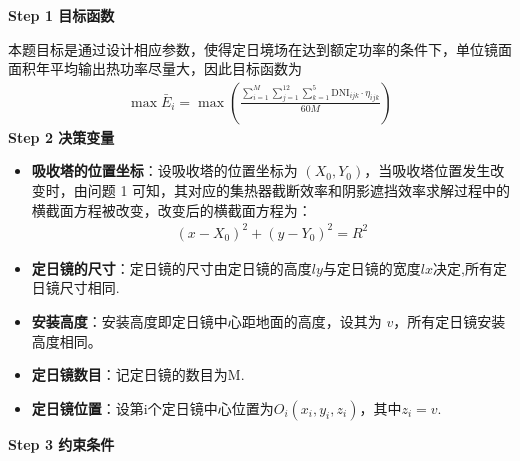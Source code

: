 \documentclass[../main.tex]{subfiles}
\begin{document}
  \noindent \textbf{Step 1 目标函数}
  \par 本题目标是通过设计相应参数，使得定日境场在达到额定功率的条件下，单位镜面面积年平均输出热功率尽量大，因此目标函数为
  \begin{align}\label{2.1}
    \max \bar{E}_i = \max\left( \frac{\sum_{i=1}^{M} \sum_{j=1}^{12} \sum_{k=1}^{5} \text{DNI}_{ijk} \cdot \eta_{ijk}}{60M} \right)
  \end{align}
  \noindent \textbf{Step 2 决策变量}
   \begin{itemize}
  \item \textbf{吸收塔的位置坐标}：设吸收塔的位置坐标为 \((X_0, Y_0)\)，当吸收塔位置发生改变时，由问题 1 可知，其对应的集热器截断效率和阴影遮挡效率求解过程中的横截面方程被改变，改变后的横截面方程为：
  \begin{align}\label{2.2}
    (x - X_0)^2 + (y - Y_0)^2 = R^2
  \end{align}
  \item \textbf{定日镜的尺寸}：定日镜的尺寸由定日镜的高度\(ly\)与定日镜的宽度\(lx\)决定,所有定日镜尺寸相同.
  \item \textbf{安装高度}：安装高度即定日镜中心距地面的高度，设其为 \(v\)，所有定日镜安装高度相同。
  \item \textbf{定日镜数目}：记定日镜的数目为M.
  \item \textbf{定日镜位置}：设第i个定日镜中心位置为$O_{i}(x_i,y_i,z_i)$，其中$z_i=v$.
  \end{itemize}
\noindent \textbf{Step 3 约束条件}
\end{document}
